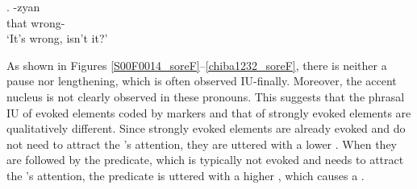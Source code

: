 \exg. \label{chiba1232_sore} \tp{\dvline} -zyan \tp{\dvline} \\
		that {} wrong- {} \\
		`It's wrong, isn't it?'

As shown in Figures \ref{S00F0014_soreF}--\ref{chiba1232_soreF},
there is neither a pause nor  lengthening,
which is often observed IU-finally.
Moreover, the accent nucleus is not clearly observed in these pronouns.
This suggests that
the phrasal IU of evoked elements coded by  markers and
that of strongly evoked elements are qualitatively different.
Since strongly evoked elements are already evoked and do not need to attract the 's attention,
they are uttered with a lower .
When they are followed by the predicate, which is typically not evoked and needs to attract the 's attention,
the predicate is uttered with a higher ,
which causes a .


